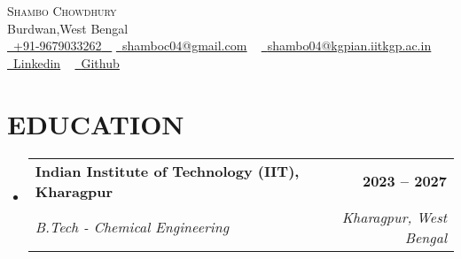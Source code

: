 \documentclass[letterpaper,11pt]{article}
\makeatletter
\newcommand{\resumeSubheading}[4]{
  \vspace{-2pt}\item
    \begin{tabular*}{1.0\textwidth}[t]{l@{\extracolsep{\fill}}r}
      \textbf{\large#1} & \textbf{\small #2} \\
      \textit{\large#3} & \textit{\small #4} \\
      
    \end{tabular*}\vspace{-7pt}
}
\newcommand{\resumeSubHeadingListStart}{\begin{itemize}[leftmargin=0.0in, label={}]}
\newcommand{\resumeSubHeadingListEnd}{\end{itemize}}
\makeatother
\begin{document}
\begin{center}
    {\Huge \scshape Shambo Chowdhury} \\ \vspace{1pt}
    Burdwan,West Bengal \\ \vspace{1pt}
    \small \href{tel:#}{ \raisebox{-0.1\height}\faPhone\ \underline{+91-9679033262} ~} 
    \href{mailto:shamboc04@gmail.com}{\raisebox{-0.2\height}\faEnvelope\  \underline{shamboc04@gmail.com}} ~ 
    \href{mailto:shambo04@kgpian.iitkgp.ac.in}{\raisebox{-0.2\height}\faEnvelope\  \underline{shambo04@kgpian.iitkgp.ac.in}} ~ 
    \href{https://linkedin.com/in/shambo04}{\raisebox{-0.2\height}\faLinkedinSquare\ \underline{Linkedin}}  ~
    \href{https://github.com/typhonshambo}{\raisebox{-0.2\height}\faGithub\ \underline{Github}} ~

\end{center}
 \vspace{0.5mm}


\section{EDUCATION}
  \resumeSubHeadingListStart
    \resumeSubheading
      {Indian Institute of Technology (IIT), Kharagpur}{2023 – 2027}
      {B.Tech - Chemical Engineering}{Kharagpur, West Bengal}
  \resumeSubHeadingListEnd
  

\end{document}
